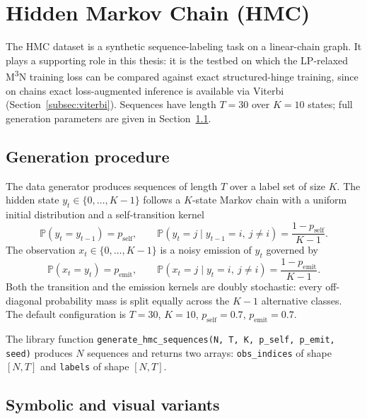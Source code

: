 \section{Hidden Markov Chain (HMC)}
\label{sec:datasets-hmc}

The HMC dataset is a synthetic sequence-labeling task on a
linear-chain graph. It plays a supporting role in this thesis: it
is the testbed on which the LP-relaxed M\textsuperscript{3}N
training loss can be compared against exact structured-hinge
training, since on chains exact loss-augmented inference is
available via Viterbi (Section~\ref{subsec:viterbi}). Sequences
have length $T = 30$ over $K = 10$ states; full generation
parameters are given in Section~\ref{subsec:hmc-generation}.

\subsection{Generation procedure}
\label{subsec:hmc-generation}

The data generator produces sequences of length $T$ over a label
set of size $K$. The hidden state $y_t \in \{0, \ldots, K-1\}$
follows a $K$-state Markov chain with a uniform initial
distribution and a self-transition kernel
\begin{equation}
    \mathbb{P}(y_t = y_{t-1}) = p_{\mathrm{self}},
    \qquad
    \mathbb{P}(y_t = j \mid y_{t-1} = i,\ j \neq i)
    = \frac{1 - p_{\mathrm{self}}}{K - 1}.
    \label{eq:hmc-transition}
\end{equation}
The observation $x_t \in \{0, \ldots, K-1\}$ is a noisy emission
of $y_t$ governed by
\begin{equation}
    \mathbb{P}(x_t = y_t) = p_{\mathrm{emit}},
    \qquad
    \mathbb{P}(x_t = j \mid y_t = i,\ j \neq i)
    = \frac{1 - p_{\mathrm{emit}}}{K - 1}.
    \label{eq:hmc-emission}
\end{equation}
Both the transition and the emission kernels are doubly
stochastic: every off-diagonal probability mass is split equally
across the $K - 1$ alternative classes. The default
configuration is $T = 30$, $K = 10$,
$p_{\mathrm{self}} = 0.7$, $p_{\mathrm{emit}} = 0.7$.

The library function
\texttt{generate\_hmc\_sequences(N, T, K, p\_self, p\_emit, seed)}
produces $N$ sequences and returns two arrays:
\texttt{obs\_indices} of shape $[N, T]$ and \texttt{labels} of
shape $[N, T]$.

\subsection{Symbolic and visual variants}
\label{subsec:hmc-variants}

